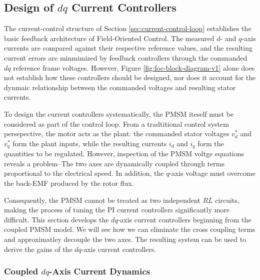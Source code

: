 \documentclass{article}
\begin{document}
\subsection{Design of \texorpdfstring{$dq$}{dq} Current Controllers}
\label{sec:design-of-dq-current-controllers}

The current-control structure of Section \ref{sec:current-control-loop} establishes the basic feedback architecture of Field-Oriented Control. The measured $d$- and $q$-axis currents are compared against their respective reference values, and the resulting current errors are minmimized by feedback controllers through the commanded $dq$ reference frame voltages. However, Figure \ref{fig:foc-block-diagram-v1} alone does not establish how these controllers should be designed, nor does it account for the dynmaic relationship between the commanded voltages and resulting stator currents.

To design the current controllers systematically, the PMSM iteself must be considered as part of the control loop. From a tradtitional control system persepective, the motor acts as the plant: the commanded stator voltages $v_d^*$ and $v_q^*$ form the plant inputs, while the resulting currents $i_d$ and $i_q$ form the quantities to be regulated. However, inspection of the PMSM voltge equations reveals a problem--The two axes are dynamically coupled through terms proportional to the electrical speed. In addition, the $q$-axis voltage must overcome the back-EMF produced by the rotor flux.

Consequently, the PMSM cannot be treated as two independent $RL$ circuits, making the process of tuning the PI current controllers significantly more difficult. This section develops the $dq$-axis current controllers beginning from the coupled PMSM model. We will see how we can eliminate the cross coupling terms and approximatley decouple the two axes. The resulting system can be used to derive the gains of the $dq$-axis current controllers. 


\subsubsection{Coupled \texorpdfstring{$dq$}{dq}-Axis Current Dynamics}
\label{sec:coupled-dq-axis-current-dynamics}
\end{document}
